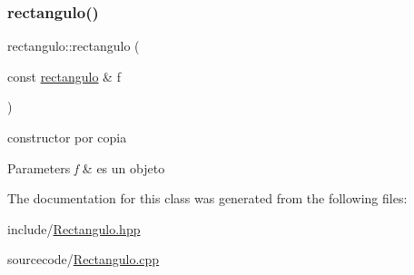 \subsubsection{\texorpdfstring{rectangulo()}{rectangulo()}\hspace{0.1cm}{\footnotesize\ttfamily [2/2]}}
{\footnotesize\ttfamily rectangulo\+::rectangulo (\begin{DoxyParamCaption}\item[{const \hyperlink{classrectangulo}{rectangulo} \&}]{f }\end{DoxyParamCaption})}



constructor por copia 


\begin{DoxyParams}{Parameters}
{\em f} & es un objeto \\
\hline
\end{DoxyParams}


The documentation for this class was generated from the following files\+:\begin{DoxyCompactItemize}
\item 
include/\hyperlink{_rectangulo_8hpp}{Rectangulo.\+hpp}\item 
sourcecode/\hyperlink{_rectangulo_8cpp}{Rectangulo.\+cpp}\end{DoxyCompactItemize}
